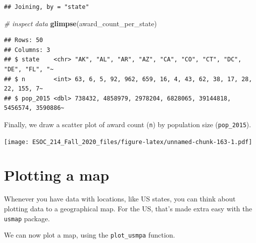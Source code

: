 \documentclass[
]{book}
\newenvironment{Shaded}{\begin{snugshade}}{\end{snugshade}}
\newcommand{\CommentTok}[1]{\textcolor[rgb]{0.56,0.35,0.01}{\textit{#1}}}
\newcommand{\DataTypeTok}[1]{\textcolor[rgb]{0.13,0.29,0.53}{#1}}
\newcommand{\DecValTok}[1]{\textcolor[rgb]{0.00,0.00,0.81}{#1}}
\newcommand{\KeywordTok}[1]{\textcolor[rgb]{0.13,0.29,0.53}{\textbf{#1}}}
\newcommand{\NormalTok}[1]{#1}
\newcommand{\OperatorTok}[1]{\textcolor[rgb]{0.81,0.36,0.00}{\textbf{#1}}}
\newcommand{\StringTok}[1]{\textcolor[rgb]{0.31,0.60,0.02}{#1}}
\begin{document}
\begin{verbatim}
## Joining, by = "state"
\end{verbatim}

\begin{Shaded}
\begin{Highlighting}[]
\CommentTok{# inspect data}
\KeywordTok{glimpse}\NormalTok{(award_count_per_state)}
\end{Highlighting}
\end{Shaded}

\begin{verbatim}
## Rows: 50
## Columns: 3
## $ state    <chr> "AK", "AL", "AR", "AZ", "CA", "CO", "CT", "DC", "DE", "FL", "~
## $ n        <int> 63, 6, 5, 92, 962, 659, 16, 4, 43, 62, 38, 17, 28, 22, 155, 7~
## $ pop_2015 <dbl> 738432, 4858979, 2978204, 6828065, 39144818, 5456574, 3590886~
\end{verbatim}

Finally, we draw a scatter plot of award count (\texttt{n}) by population size (\texttt{pop\_2015}).

\begin{Shaded}
\end{Shaded}

\texttt{[image: ESOC\_214\_Fall\_2020\_files/figure-latex/unnamed-chunk-163-1.pdf]}

\hypertarget{plotting-a-map}{%
\section{Plotting a map}\label{plotting-a-map}}

Whenever you have data with locations, like US states, you can think about plotting data to a geographical map. For the US, that's made extra easy with the \texttt{usmap} package.

We can now plot a map, using the \texttt{plot\_usmpa} function.

\begin{Shaded}
\end{Shaded}
\end{document}
